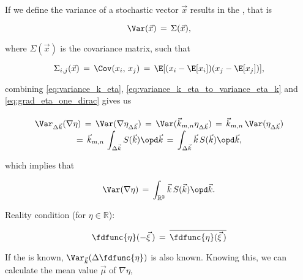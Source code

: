 {\HRule

If we define the variance of a stochastic vector $\vec{x}$ results in the , that is

\begin{equation}
\Var(\vec{x}) \,=\, \Sigma(\vec{x}),
\end{equation}

where $\Sigma(\vec{x})$ is the covariance matrix, such that

\begin{equation}
\Sigma_{i,j}(\vec{x}) \,=\, \Cov(x_i,\,x_j) \,=\, \E[(x_i - \E[x_i])(x_j - \E[x_j])],
\end{equation}

combining \eqref{eq:variance_k_eta}, \eqref{eq:variance_k_eta_to_variance_eta_k} and \eqref{eq:grad_eta_one_dirac} gives us

\begin{equation}
\renewcommand*{\arraystretch}{1.5}
\begin{array}{c}
\displaystyle \Var_{\Delta\vec{k}}(\nabla\eta) \,=\, \Var(\nabla\eta_{\Delta\vec{k}}) \,=\, \Var(\vec{k}_{m,n}\eta_{\Delta\vec{k}}) \,=\, \vec{k}_{m,n}\,\Var(\eta_{\Delta\vec{k}}) \\
\displaystyle =\, \vec{k}_{m,n}\,\int_{\Delta\vec{k}}S(\vec{k})\opd\vec{k} \,=\, \int_{\Delta\vec{k}}\vec{k}\,S(\vec{k})\opd\vec{k},
\end{array}
\end{equation}

which implies that 

\begin{equation}
\Var(\nabla\eta) \,=\, \int_{\mathbb{R}^2}\vec{k}\,S(\vec{k})\opd\vec{k}.
\end{equation}







\HRule

Reality condition (for $\eta\in\mathbb{R}$):

\begin{equation}
\fdfunc{\eta}(-\vec{\xi}\,) \,=\, \overline{\fdfunc{\eta}(\vec{\xi}\,)}
\end{equation}

\HRule

If the  is known, $\Var_{\vec{k}}(\Delta\fdfunc{\eta})$ is also known. Knowing this, we can calculate the mean value $\vec{\mu}$ of $\nabla\eta$,

}
